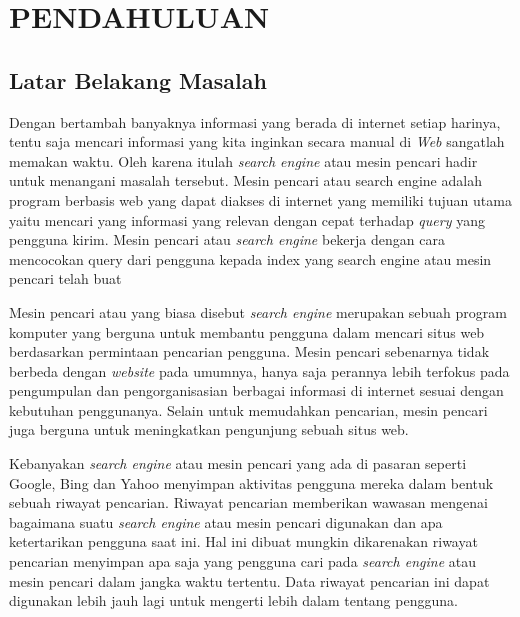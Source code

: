 
\chapter{PENDAHULUAN}

\section{Latar Belakang Masalah}

Dengan bertambah banyaknya informasi yang berada di internet setiap harinya, tentu saja mencari informasi yang kita inginkan secara manual di \textit{Web} sangatlah memakan waktu. Oleh karena itulah \textit{search engine} atau mesin pencari hadir untuk menangani masalah tersebut. Mesin pencari atau search engine adalah program berbasis web yang dapat diakses di internet yang memiliki tujuan utama yaitu mencari yang informasi yang relevan dengan cepat terhadap \textit{query} yang pengguna kirim. Mesin pencari atau \textit{search engine} bekerja dengan cara mencocokan query dari pengguna kepada index yang search engine atau mesin pencari telah buat

Mesin pencari atau yang biasa disebut \emph{search engine} merupakan sebuah program komputer yang berguna untuk membantu pengguna dalam mencari situs web berdasarkan permintaan pencarian pengguna. Mesin pencari sebenarnya tidak berbeda dengan \textit{website} pada umumnya, hanya saja perannya lebih terfokus pada pengumpulan dan pengorganisasian berbagai informasi di internet sesuai dengan kebutuhan penggunanya. Selain untuk memudahkan pencarian, mesin pencari juga berguna untuk meningkatkan pengunjung sebuah situs web.

Kebanyakan \textit{search engine} atau mesin pencari yang ada di pasaran seperti Google, Bing dan Yahoo menyimpan aktivitas pengguna mereka dalam bentuk sebuah riwayat pencarian. Riwayat pencarian memberikan wawasan mengenai bagaimana suatu \textit{search engine} atau mesin pencari digunakan dan apa ketertarikan pengguna saat ini. Hal ini dibuat mungkin dikarenakan riwayat pencarian menyimpan apa saja yang pengguna cari pada \textit{search engine} atau mesin pencari dalam jangka waktu tertentu. Data riwayat pencarian ini dapat digunakan lebih jauh lagi untuk mengerti lebih dalam tentang pengguna.

